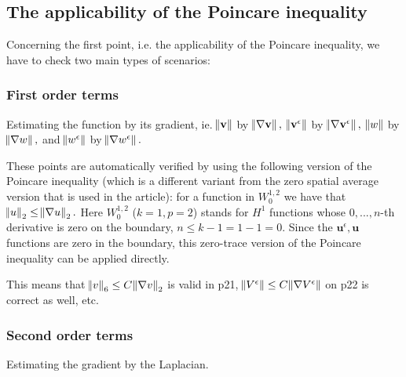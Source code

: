 \documentclass[11pt]{article}
\begin{document}
\subsection{The applicability of the Poincare inequality}

Concerning the first point, i.e. the applicability of the Poincare inequality, we have to check two main types of scenarios:

\subsubsection{First order terms}
  Estimating the function by its gradient, ie. $\norm{\mathbf{v}}$ by $\norm{\nabla \mathbf{v}}, $ $\norm{\mathbf{v}^\epsilon}$ by $\norm{\nabla \mathbf{v}^\epsilon}, $ $\norm{w}$ by $\norm{\nabla w}, $ and $\norm{w^\epsilon}$ by $\norm{\nabla w^\epsilon}. $
  
  These points are automatically verified by using the following version of the Poincare inequality (which is a different variant from the zero spatial average version that is used in the article): for a function in $W^{1,2}_0$ we have that $\norm{u}_2 \leq \norm{\nabla u}_2.$ Here $W^{1,2}_0$ ($k=1, p=2$) stands for $H^1$ functions whose $0, ... , n$-th derivative is zero on the boundary, $n \leq k-1 = 1-1 = 0.$ Since the $\mathbf{u}^\epsilon, \mathbf{u}$ functions are zero in the boundary, this zero-trace version of the Poincare inequality can be applied directly.
  
  This means that $\norm{v}_6 \leq C \norm{\nabla v}_2$ is valid in p21, $\norm{V^\epsilon} \leq C \norm{\nabla V^\epsilon}$ on p22 is correct as well, etc.
 
\subsubsection{Second order terms}

Estimating the gradient by the Laplacian.
\end{document}
